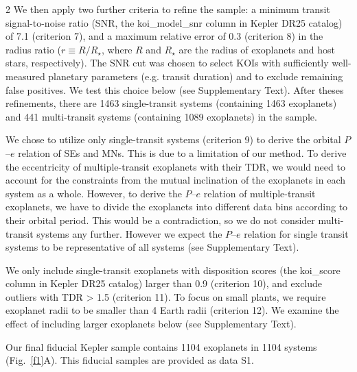 \documentclass[10pt]{article}
\begin{document}
\begin{multicols}{2}
We then apply two further criteria to refine the sample: a minimum transit signal-to-noise ratio (SNR, the koi\_model\_snr column in Kepler DR25 catalog) of 7.1 (criterion 7)\cite{2011ApJ...736...19B}, and a maximum relative error of 0.3 (criterion 8) in the radius ratio ($r \equiv R/R_{\star}$, where $R$ and $R_\star$ are the radius of exoplanets and host stars, respectively)\cite{2019AJ....157..198M}.
The SNR cut was chosen to select KOIs with sufficiently well-measured planetary parameters (e.g. transit duration) and to exclude remaining false positives.
We test this choice below (see Supplementary Text).
After theses refinements, there are 1463 single-transit systems (containing 1463 exoplanets) and 441 multi-transit systems (containing 1089 exoplanets) in the sample.

We chose to utilize only single-transit systems (criterion 9) to derive the orbital $P$--$e$ relation of SEs and MNs.
This is due to a limitation of our method.
To derive the eccentricity of multiple-transit exoplanets with their TDR, we would need to account for the constraints from the mutual inclination of the exoplanets in each system as a whole\cite{2016PNAS..11311431X}.
However, to derive the $P$--$e$ relation of multiple-transit exoplanets, we have to divide the exoplanets into different data bins according to their orbital period.
This would be a contradiction, so we do not consider multi-transit systems any further.
However we expect the $P$--$e$ relation for single transit systems to be representative of all systems (see Supplementary Text).

We only include single-transit exoplanets with disposition scores (the koi\_score column in Kepler DR25 catalog) larger than 0.9 (criterion 10)\cite{2018ApJS..235...38T}, and exclude outliers with TDR > 1.5 (criterion 11).
To focus on small plants, we require exoplanet radii to be smaller than 4 Earth radii (criterion 12)\cite{2012ApJS..201...15H,2013ApJ...770...69P}.
We examine the effect of including larger exoplanets below (see Supplementary Text).

Our final fiducial Kepler sample contains 1104 exoplanets in 1104 systems (Fig.~\ref{f1}A).
This fiducial samples are provided as data S1\cite{zenodo}.


\end{multicols}
\end{document}
